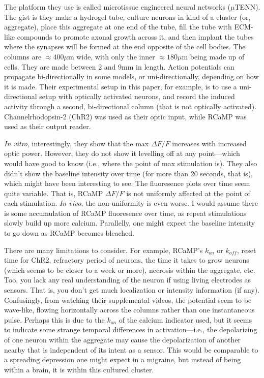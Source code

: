 The platform they use is called microtissue engineered neural networks ($\mu$TENN). The gist is they make a hydrogel tube, culture neurons in kind of a cluster (or, aggregate), place this aggregate at one end of the tube, fill the tube with ECM-like compounds to promote axonal growth across it, and then implant the tubes where the synapses will be formed at the end opposite of the cell bodies. The columns are $\approx 400\mu$m wide, with only the inner $\approx 180\mu$m being made up of cells. They are made between 2 and 9mm in length. Action potentials can propagate bi-directionally in some models, or uni-directionally, depending on how it is made. Their experimental setup in this paper, for example, is to use a uni-directional setup with optically activated neurons, and record the induced activity through a second, bi-directional column (that is not optically activated). Channelrhodopsin-2 (ChR2) was used as their optic input, while RCaMP was used as their output reader. \newline

\textit{In vitro}, interestingly, they show that the max $\Delta F/F$ increases with increased optic power. However, they do not show it levelling off at any point---which would have good to know (i.e., where the point of max stimulation is). They also didn't show the baseline intensity over time (for more than 20 seconds, that is), which might have been interesting to see. The fluoresence plots over time seem quite variable. That is, RCaMP $\Delta F/F$ is not uniformly affected at the point of each stimulation. \textit{In vivo}, the non-uniformity is even worse. I would assume there is some accumulation of RCaMP fluoresence over time, as repeat stimulations slowly build up more calcium. Parallelly, one might expect the baseline intensity to go down as RCaMP becomes bleached. \newline

There are many limitations to consider. For example, RCaMP's $k_{on}$ or $k_{off}$, reset time for ChR2, refractory period of neurons, the time it takes to grow neurons (which seems to be closer to a week or more), necrosis within the aggregate, etc. Too, you lack any real understanding of the neuron if using living electrodes as sensors. That is, you don't get much localization or intensity information (if any). Confusingly, from watching their supplemental videos, the potential seem to be wave-like, flowing horizontally across the columns rather than one instantaneous pulse. Perhaps this is due to the $k_{on}$ of the calcium indicator used, but it seems to indicate some strange temporal differences in activation---i.e., the depolarizing of one neuron within the aggregate may cause the depolarization of another nearby that is independent of its intent as a sensor. This would be comparable to a spreading depression one might expect in a migraine, but instead of being within a brain, it is within this cultured cluster.\newline

